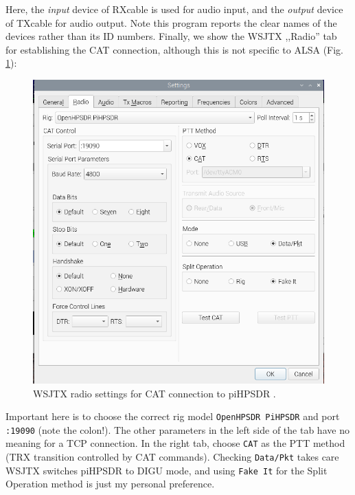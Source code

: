 \documentclass[12pt]{book}
\def\rett#1{\texttt{\color{red}#1}}
\def\pH{pi\-HPSDR }
\begin{document}
Here, the \textit{input} device of RXcable is used for audio input, and the
\textit{output} device of TXcable for audio output. Note this program reports the
clear names of the devices rather than its ID numbers. Finally, we show the WSJTX ,,Radio''
tab for establishing the CAT connection, although this is not specific to ALSA
(Fig. \ref{fig:wsjtx_settings_radio}):

\begin{figure}[ht]
\center
\includegraphics[width=12cm]{wsjtx_settings_radio.png}
\caption{WSJTX radio settings for CAT connection to \pH.}
\label{fig:wsjtx_settings_radio}
\end{figure}

Important here is to choose the correct rig model \rett{OpenHPSDR PiHPSDR} and
port \rett{:19090} (note the colon!). The other parameters in the left side of the tab
have no meaning for a TCP connection. In the right tab, choose \rett{CAT} as
the PTT method (TRX transition controlled by CAT commands). Checking \rett{Data/Pkt}
takes care WSJTX switches \pH to DIGU mode, and using \rett{Fake It} for the Split
Operation method is just my personal preference.
\end{document}
